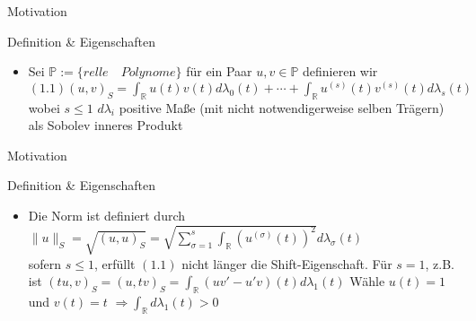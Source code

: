 \documentclass[9pt,t,handout]{beamer}
\begin{document}
\begin{frame}

    \begin{center}
         \alert{Motivation}

         \alert{Definition \& Eigenschaften}
    \end{center}

  \begin{itemize}
    \item Sei $\mathbb{P} :=\{relle \quad Polynome\}$ für ein Paar $u,v \in    \mathbb{P}$ definieren wir 
      $(1.1) (u,v)_S= \int_{\mathbb{R}}u(t)v(t) d\lambda_0(t)+\cdots+\int_{\mathbb{R}}u^{(s)}(t)v^{(s)}(t) d\lambda_s(t)$ wobei $s\le 1$ $d\lambda_i$ positive  Maße (mit nicht notwendigerweise selben Trägern) als Sobolev inneres  Produkt
  \end{itemize}

  \pause

    \begin{center}
         \alert{Motivation}

         \alert{Definition \& Eigenschaften}
    \end{center}

  \begin{itemize}
      \item Die Norm ist definiert durch $\lVert u\rVert_S=\sqrt{(u,u)_S}=    \sqrt{\sum_{\sigma=1}^s\int_{\mathbb{R}}(u^{(\sigma)}(t))^2} d\lambda_{\sigma}(t)$\\ sofern $s\le 1$, erfüllt $(1.1)$ nicht länger die Shift-Eigenschaft.
    Für $s=1$, z.B. ist $(tu,v)_S=(u,tv)_S=\int_{\mathbb{R}}(uv'-u'v)(t) d\lambda_1(t)$ 
    Wähle $u(t)=1$ und $v(t)=t$ $\Rightarrow \int_{\mathbb{R}}d\lambda_1(t)>0$
  \end{itemize}

\end{frame}
\end{document}
